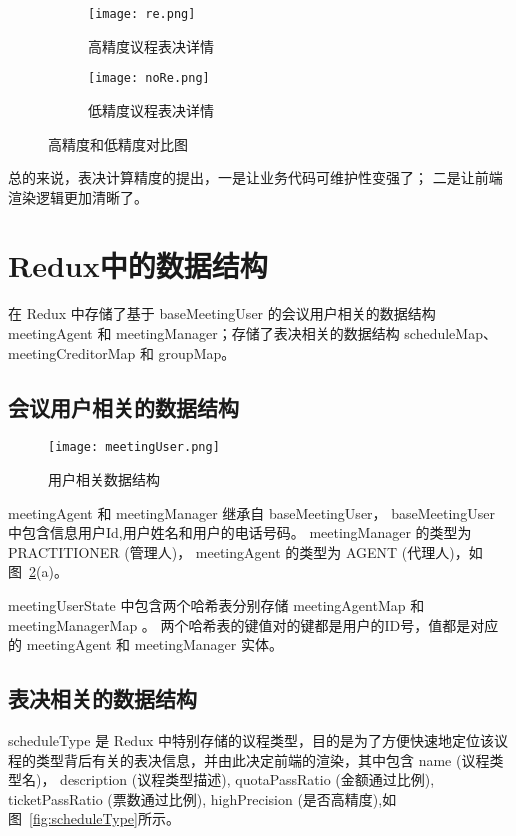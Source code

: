   \begin{figure}[!htp]
    \centering
    \begin{subfigure}{1\textwidth}
      \centering
      \texttt{[image: re.png]}
      \caption{高精度议程表决详情}
    \end{subfigure}
    \hspace{1cm}
    \begin{subfigure}{1\textwidth}
      \centering
      \texttt{[image: noRe.png]}
      \caption{低精度议程表决详情}
    \end{subfigure}
    \caption{高精度和低精度对比图}
    \label{fig:reAndNoRe}
  \end{figure}

  总的来说，表决计算精度的提出，一是让业务代码可维护性变强了；
  二是让前端渲染逻辑更加清晰了。

  \section{Redux中的数据结构}

  在 Redux 中存储了基于 baseMeetingUser 的会议用户相关的数据结构 meetingAgent 和 meetingManager；存储了表决相关的数据结构 scheduleMap、meetingCreditorMap 和 groupMap。

  \subsection{会议用户相关的数据结构}


  \begin{figure}[!htp]
    \centering
    \texttt{[image: meetingUser.png]}
    \caption{用户相关数据结构}
    \label{fig:meetingUser}
  \end{figure}

  meetingAgent 和 meetingManager 继承自 baseMeetingUser， baseMeetingUser 中包含信息用户Id,用户姓名和用户的电话号码。 meetingManager 的类型为 PRACTITIONER (管理人)， meetingAgent 的类型为 AGENT (代理人)，如图~\ref{fig:meetingUser}(a)。

  meetingUserState 中包含两个哈希表分别存储 meetingAgentMap 和
  meetingManagerMap 。 两个哈希表的键值对的键都是用户的ID号，值都是对应的 meetingAgent 和 meetingManager 实体。

  \subsection{表决相关的数据结构}

  scheduleType 是 Redux 中特别存储的议程类型，目的是为了方便快速地定位该议程的类型背后有关的表决信息，并由此决定前端的渲染，其中包含 name (议程类型名)， description (议程类型描述), quotaPassRatio (金额通过比例), ticketPassRatio (票数通过比例), highPrecision (是否高精度),如图~\ref{fig:scheduleType}所示。

